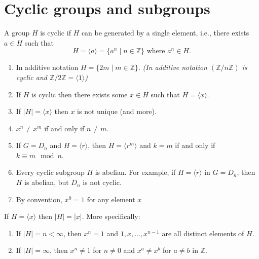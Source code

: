 \documentclass[11pt,a4paper]{article}
\begin{document}
\def\contador{Lesson 7}


\section{Cyclic groups and subgroups}

\begin{defi}
    A group $H$ is cyclic if $H$ can be generated by a single element, i.e., there exists $a \in H$ such that
\[
H = \langle a \rangle = \{a^n \mid n \in \mathbb{Z}\} \text{ where } a^n \in H.
\]
\end{defi}


\begin{rem}
    \begin{enumerate}
        \item In additive notation $H = \{2m \mid m \in \mathbb{Z}\}$. \textit{(In additive notation $(\mathbb{Z}/n\mathbb{Z})$ is cyclic and $\mathbb{Z}/2\mathbb{Z} = \langle 1 \rangle$)}
        \item If $H$ is cyclic then there exists some $x \in H$ such that $H = \langle x \rangle$.
        \item If $\lvert H \rvert = \langle x \rangle$ then $x$ is not unique (and more).
        \item $x^n \neq x^m$ if and only if $n \neq m$.
        \item If $G = D_n$ and $H = \langle r \rangle$, then $H = \langle r^m \rangle$ and $k = m$ if and only if $k \equiv m \mod n$.
        \item      Every cyclic subgroup $H$ is abelian. For example, if $H = \langle r \rangle$ in $G = D_n$, then $H$ is abelian, but $D_n$ is not cyclic.
        \item By convention, \(x^0 = 1\) for any element \(x\)
    \end{enumerate}
\end{rem}


\begin{prop}
    If \( H = \langle x \rangle \) then \( \lvert H \rvert = \lvert x \rvert \). More specifically:
    \begin{enumerate}
        \item If \( \lvert H \rvert = n < \infty \), then \( x^n = 1 \) and \( 1, x, \dots, x^{n-1} \) are all distinct elements of \( H \).
        \item If \( \lvert H \rvert = \infty \), then \( x^n \neq 1 \) for \( n \neq 0 \) and \( x^a \neq x^b \) for \( a \neq b \) in \( \mathbb{Z} \).
    \end{enumerate}
\end{prop}
\end{document}
